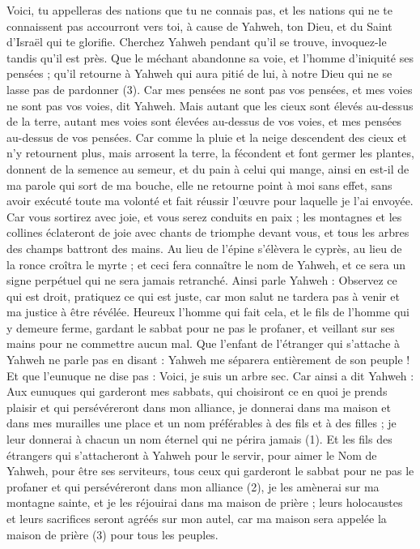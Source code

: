 \begin{multicols}{2}
{Voici, tu appelleras des nations que tu ne connais pas, et les nations qui ne te connaissent pas accourront vers toi, à cause de Yahweh, ton Dieu, et du Saint d'Israël qui te glorifie.
Cherchez Yahweh pendant qu'il se trouve, invoquez-le tandis qu'il est près.
Que le méchant abandonne sa voie, et l'homme d’iniquité ses pensées ; qu'il retourne à Yahweh qui aura pitié de lui, à notre Dieu qui ne se lasse pas de pardonner (3).
Car mes pensées ne sont pas vos pensées, et mes voies ne sont pas vos voies, dit Yahweh.
Mais autant que les cieux sont élevés au-dessus de la terre, autant mes voies sont élevées au-dessus de vos voies, et mes pensées au-dessus de vos pensées.
Car comme la pluie et la neige descendent des cieux et n'y retournent plus, mais arrosent la terre, la fécondent et font germer les plantes, donnent de la semence au semeur, et du pain à celui qui mange,
ainsi en est-il de ma parole qui sort de ma bouche, elle ne retourne point à moi sans effet, sans avoir exécuté toute ma volonté et fait réussir l’œuvre pour laquelle je l’ai envoyée.
Car vous sortirez avec joie, et vous serez conduits en paix ; les montagnes et les collines éclateront de joie avec chants de triomphe devant vous, et tous les arbres des champs battront des mains.
Au lieu de l’épine s’élèvera le cyprès, au lieu de la ronce croîtra le myrte ; et ceci fera connaître le nom de Yahweh, et ce sera un signe perpétuel qui ne sera jamais retranché.
\VerseOne{}Ainsi parle Yahweh : Observez ce qui est droit, pratiquez ce qui est juste, car mon salut ne tardera pas à venir et ma justice à être révélée.
Heureux l'homme qui fait cela, et le fils de l'homme qui y demeure ferme, gardant le sabbat pour ne pas le profaner, et veillant sur ses mains pour ne commettre aucun mal.
Que l'enfant de l'étranger qui s’attache à Yahweh ne parle pas en disant : Yahweh me séparera entièrement de son peuple ! Et que l'eunuque ne dise pas : Voici, je suis un arbre sec.
Car ainsi a dit Yahweh : Aux eunuques qui garderont mes sabbats, qui choisiront ce en quoi je prends plaisir et qui persévéreront dans mon alliance,
je donnerai dans ma maison et dans mes murailles une place et un nom préférables à des fils et à des filles ; je leur donnerai à chacun un nom éternel qui ne périra jamais (1).
Et les fils des étrangers qui s’attacheront à Yahweh pour le servir, pour aimer le Nom de Yahweh, pour être ses serviteurs, tous ceux qui garderont le sabbat pour ne pas le profaner et qui persévéreront dans mon alliance (2),
je les amènerai sur ma montagne sainte, et je les réjouirai dans ma maison de prière ; leurs holocaustes et leurs sacrifices seront agréés sur mon autel, car ma maison sera appelée la maison de prière (3) pour tous les peuples.
}
\end{multicols}
